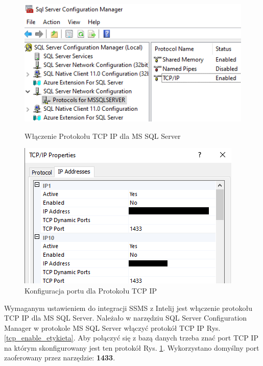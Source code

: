 \begin{figure}[ht] %
  \begin{minipage}[b]{0.6\linewidth}
    \includegraphics[width=\linewidth]{rys05/enable_tcpip.png}
    \caption{Włączenie Protokołu TCP IP dla MS SQL Server}
		\label{tcp_enable_etykieta}
  \end{minipage}
  \begin{minipage}[b]{0.5\linewidth}
    \includegraphics[width=\linewidth]{rys05/port_tcpip.png}
    \caption{Konfiguracja portu dla Protokołu TCP IP}
		\label{tcp_conf_etykieta}
  \end{minipage}
\end{figure}


Wymaganym ustawieniem do integracji SSMS z Intelij jest włączenie protokołu TCP IP dla MS SQL Server. Należało w narzędziu SQL Server Configuration Manager w protokole MS SQL Server włączyć protokół TCP IP Rys. \ref {tcp_enable_etykieta}.
Aby połączyć się z bazą danych trzeba znać port TCP IP na którym skonfigurowany jest ten protokół Rys. \ref{tcp_conf_etykieta}. Wykorzystano domyślny port zaoferowany przez narzędzie: \textbf{1433}.
\newpage

